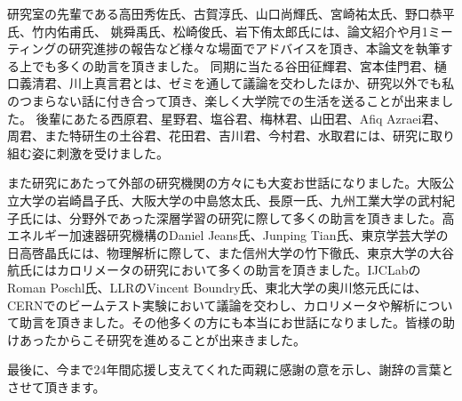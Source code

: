 研究室の先輩である高田秀佐氏、古賀淳氏、山口尚輝氏、宮崎祐太氏、野口恭平氏、竹内佑甫氏、 姚舜禹氏、松崎俊氏、岩下侑太郎氏には、論文紹介や月1ミーティングの研究進捗の報告など様々な場面でアドバイスを頂き、本論文を執筆する上でも多くの助言を頂きました。
同期に当たる谷田征輝君、宮本佳門君、樋口義清君、川上真言君とは、ゼミを通して議論を交わしたほか、研究以外でも私のつまらない話に付き合って頂き、楽しく大学院での生活を送ることが出来ました。
後輩にあたる西原君、星野君、塩谷君、梅林君、山田君、Afiq Azraei君、周君、また特研生の土谷君、花田君、吉川君、今村君、水取君には、研究に取り組む姿に刺激を受けました。

また研究にあたって外部の研究機関の方々にも大変お世話になりました。大阪公立大学の岩崎昌子氏、大阪大学の中島悠太氏、長原一氏、九州工業大学の武村紀子氏には、分野外であった深層学習の研究に際して多くの助言を頂きました。高エネルギー加速器研究機構のDaniel Jeans氏、Junping Tian氏、東京学芸大学の日高啓晶氏には、物理解析に際して、また信州大学の竹下徹氏、東京大学の大谷航氏にはカロリメータの研究において多くの助言を頂きました。IJCLabのRoman Poschl氏、LLRのVincent Boundry氏、東北大学の奥川悠元氏には、CERNでのビームテスト実験において議論を交わし、カロリメータや解析について助言を頂きました。その他多くの方にも本当にお世話になりました。皆様の助けあったからこそ研究を進めることが出来きました。

最後に、今まで24年間応援し支えてくれた両親に感謝の意を示し、謝辞の言葉とさせて頂きます。